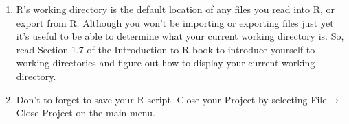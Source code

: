 \documentclass[12pt]{article}
\newcommand{\arrow}{\ensuremath{\rightarrow}}
\begin{document}
\begin{enumerate}
 

\item R’s working directory is the default location of any files you read into R, or export from R. Although you won’t be importing or exporting files just yet  it’s useful to be able to determine what your current working directory is. So, read Section 1.7 of the Introduction to R book to introduce yourself to working directories and figure out how to display your current working directory.

 

\item Don’t to forget to save your R script. Close your Project by selecting File\arrow Close Project on the main menu.

\end{enumerate}
\end{document}
